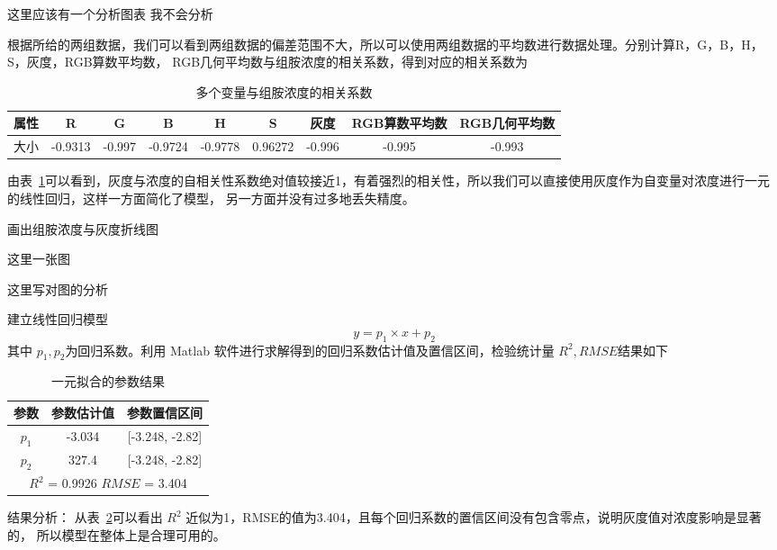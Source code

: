     这里应该有一个分析图表 我不会分析

    根据所给的两组数据，我们可以看到两组数据的偏差范围不大，所以可以使用两组数据的平均数进行数据处理。分别计算R，G，B，H，S，灰度，RGB算数平均数，
    RGB几何平均数与组胺浓度的相关系数，得到对应的相关系数为
    \begin{table}[H]
        \centering
        \caption{多个变量与组胺浓度的相关系数}
        \label{ZuAnCov}
        \begin{tabular}{@{}ccccccccc@{}}
        \toprule
        属性 & R       & G      & B       & H       & S       & 灰度     & RGB算数平均数 & RGB几何平均数 \\ \midrule
        大小 & -0.9313 & -0.997 & -0.9724 & -0.9778 & 0.96272 & -0.996 & -0.995   & -0.993   \\ \bottomrule
        \end{tabular}
        \end{table}
         
    由表~\ref{ZuAnCov}可以看到，灰度与浓度的自相关性系数绝对值较接近1，有着强烈的相关性，所以我们可以直接使用灰度作为自变量对浓度进行一元的线性回归，这样一方面简化了模型，
    另一方面并没有过多地丢失精度。

    画出组胺浓度与灰度折线图

    这里一张图

    这里写对图的分析

    建立线性回归模型
    $$ y = p_1 \times x + p_2$$
    其中 $p_{1}, p_{2}$为回归系数。利用 Matlab 软件进行求解得到的回归系数估计值及置信区间，检验统计量 $R^2, RMSE $结果如下

    \begin{table}[H]
        \centering
        \caption{一元拟合的参数结果}
        \label{ZuAnLinear}
        \begin{tabular}{@{}ccc@{}}
        \toprule
        参数         & 参数估计值      & 参数置信区间                  \\ \midrule
        $p_1$      & -3.034     & {[}-3.248, -2.82{]}     \\
        $p_2$      & 327.4      & {[}-3.248, -2.82{]}     \\
        \hline
        \multicolumn{3}{c}{$R^2$ = 0.9926 $RMSE$ = 3.404} \\ \bottomrule
        \end{tabular}
        \end{table}

    结果分析： 从表~\ref{ZuAnLinear}可以看出 $R^2$ 近似为1，RMSE的值为3.404，且每个回归系数的置信区间没有包含零点，说明灰度值对浓度影响是显著的，
    所以模型在整体上是合理可用的。
    
